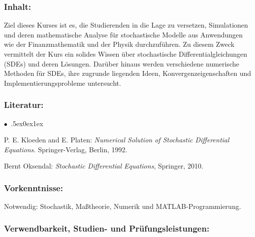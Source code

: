 \documentclass[a4paper,10pt]{article}
\renewenvironment{itemize}{\begin{list}{$\bullet$\ }{\itemsep.5ex\setlength{\topsep}{0.5\itemsep}\parsep0ex\labelsep1ex\settowidth{\labelwidth}{$\bullet$\ }\setlength{\leftmargin}{\labelwidth}\addtolength{\leftmargin}{3ex}\addtolength{\leftmargin}{\labelsep}}}{\end{list}}
\begin{document}
\subsubsection*{\large
    Inhalt:
}
Ziel dieses Kurses ist es, die Studierenden in die Lage zu versetzen, Simulationen und deren mathematische Analyse für stochastische Modelle aus Anwendungen wie der Finanzmathematik und der Physik durchzuführen. Zu diesem Zweck vermittelt der Kurs ein solides Wissen über stochastische Differentialgleichungen (SDEs) und deren Lösungen. Darüber hinaus werden verschiedene numerische Methoden für SDEs, ihre zugrunde liegenden Ideen, Konvergenzeigenschaften und Implementierungsprobleme untersucht.
\subsubsection*{\large
    Literatur:
}
\begin{itemize}
\item
P. E. Kloeden and E. Platen: \emph{Numerical Solution of Stochastic Differential Equations.} Springer-Verlag, Berlin, 1992. 
\item
Bernt Oksendal: \emph{Stochastic Differential Equations}, Springer, 2010.
\end{itemize}
\subsubsection*{\large
    Vorkenntnisse:
}
Notwendig: Stochastik, Maßtheorie, Numerik und MATLAB-Programmierung.
\cleardoublepage
\subsubsection*{\large
    Verwendbarkeit, Studien- und Prüfungsleistungen:
}
\end{document}
